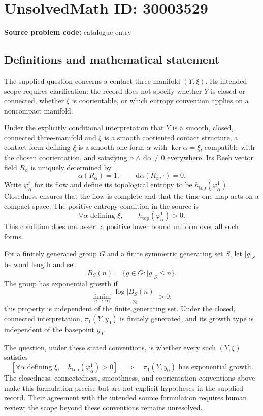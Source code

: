 \documentclass[11pt]{article}
\newcommand{\dd}{\,\mathrm{d}}
\begin{document}
\section*{UnsolvedMath ID: 30003529}
\textbf{Source problem code:} catalogue entry
\subsection{Definitions and mathematical statement}
The supplied question concerns a contact three-manifold \((Y,\xi)\). Its intended scope requires clarification: the record does not specify whether \(Y\) is closed or connected, whether \(\xi\) is coorientable, or which entropy convention applies on a noncompact manifold.

Under the explicitly conditional interpretation that \(Y\) is a smooth, closed, connected three-manifold and \(\xi\) is a smooth cooriented contact structure, a contact form defining \(\xi\) is a smooth one-form \(\alpha\) with \(\ker\alpha=\xi\), compatible with the chosen coorientation, and satisfying \(\alpha\wedge\dd\alpha\ne0\) everywhere. Its Reeb vector field \(R_\alpha\) is uniquely determined by
\[
\alpha(R_\alpha)=1,\qquad \dd\alpha(R_\alpha,\cdot)=0.
\]
Write \(\varphi_\alpha^t\) for its flow and define its topological entropy to be \(h_{\mathrm{top}}(\varphi_\alpha^1)\). Closedness ensures that the flow is complete and that the time-one map acts on a compact space. The positive-entropy condition in the source is
\[
\forall\alpha\text{ defining }\xi,\qquad h_{\mathrm{top}}(\varphi_\alpha^1)>0.
\]
This condition does not assert a positive lower bound uniform over all such forms.

For a finitely generated group \(G\) and a finite symmetric generating set \(S\), let \(\lvert g\rvert_S\) be word length and set
\[
B_S(n)=\{g\in G:\lvert g\rvert_S\le n\}.
\]
The group has exponential growth if
\[
\liminf_{n\to\infty}\frac{\log\lvert B_S(n)\rvert}{n}>0;
\]
this property is independent of the finite generating set. Under the closed, connected interpretation, \(\pi_1(Y,y_0)\) is finitely generated, and its growth type is independent of the basepoint \(y_0\).

The question, under these stated conventions, is whether every such \((Y,\xi)\) satisfies
\[
\left[\forall\alpha\text{ defining }\xi,\quad h_{\mathrm{top}}(\varphi_\alpha^1)>0\right]
\quad\Longrightarrow\quad
\pi_1(Y,y_0)\text{ has exponential growth}.
\]
The closedness, connectedness, smoothness, and coorientation conventions above make this formulation precise but are not explicit hypotheses in the supplied record. Their agreement with the intended source formulation requires human review; the scope beyond these conventions remains unresolved.
\end{document}
